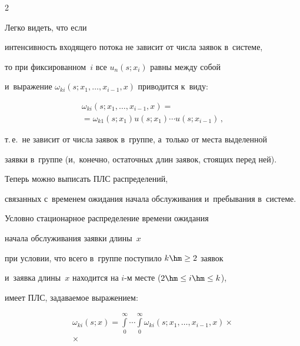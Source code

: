 \begin{multicols}{2}
\noindent


Легко видеть, что если


интенсивность входящего потока не зависит от числа заявок в~системе,


то при фиксированном~$i$ все $u_n(s;x_i)$ равны между собой


и~выражение $\omega_{ki}(s;x_1, \dots, x_{i-1},x)$ приводится к~виду:





\noindent


\begin{multline*}


\omega_{ki}(s;x_1, \dots, x_{i-1},x)={}\\


{}=


\omega_{k1}(s;x_1)u(s;x_1)\cdots u(s;x_{i-1})\,,


\end{multline*}


т.\,е.\ не зависит от числа заявок в~группе, а~только от места выделенной


заявки в~группе (и,~конечно, остаточных длин заявок, стоящих перед ней).





Теперь можно выписать ПЛС распределений,


связанных с~временем ожидания начала обслуживания и~пребывания в~системе.


Условно стационарное распределение времени ожидания


начала обслуживания заявки длины~$x$


при условии, что всего в~группе поступило $k\hm\ge2$ заявок


и~заявка длины~$x$ находится на $i$-м месте ($2 \hm\le i \hm\le k$),


имеет ПЛС, задаваемое выражением:





\noindent


\begin{multline}


\omega_{ki}(s;x)


=


\int\limits_0^\infty\!\cdots\!\int\limits_0^\infty


\omega_{ki}\left(s;x_1, \dots, x_{i-1},x\right)\times{}\\


{}\times



\end{multline}
\end{multicols}

